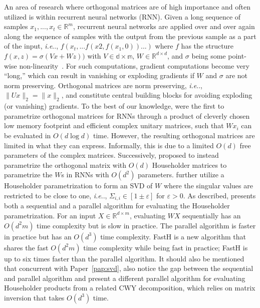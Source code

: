 \documentclass[11pt,a4paper,twoside,openright,final]{memoir}
\makeatletter
\DeclareRobustCommand\onedot{\futurelet\@let@token\@onedot}
\def\@onedot{\ifx\@let@token.\else.\null\fi\xspace}
\def\ie{\emph{i.e}\onedot} \def\Ie{\emph{I.e}\onedot}
\newcommand*{\paperref}[1]{Paper~\hyperref[#1]{\ref{#1}}}
\makeatother
\begin{document}
An area of research where orthogonal matrices are of high importance and often utilized is within recurrent neural networks (RNN).
Given a long sequence of samples $x_1, ..., x_t\in\mathbb{R}^{m}$, recurrent neural networks are applied over and over again along the sequence of samples with the output from the previous sample as a part of the input, \ie, $f(x_t, ...f(x2, f(x_1, 0)) ... )$ where $f$ has the structure $f(x, z) = \sigma( Vx + Wz) )$ with $V\in \mathbb{d\times m}$, $W\in\mathbb{R}^{d\times d}$, and $\sigma$ being some point-wise non-linearity~\cite{urnn}.
For such computations, gradient computations become very ``long,'' which can result in vanishing or exploding gradients if $W$ and $\sigma$ are not norm preserving.
Orthogonal matrices are norm preserving, \ie, $\|Ux\|_2 = \|x\|_2$, and constitute central building blocks for avoiding exploding (or vanishing) gradients.
To the best of our knowledge, \citet{urnn} were the first to parametrize orthogonal matrices for RNNs through a product of cleverly chosen low memory footprint and efficient complex unitary matrices, such that $Wx_i$ can be evaluated in $O(d \log d)$ time.
However, the resulting orthogonal matrices are limited in what they can express. 
Informally, this is due to a limited $O(d)$ free parameters of the complex matrices.
Successively, \citet{hh-rnn} proposed to instead parametrize the orthogonal matrix with $O(d)$ Householder matrices to parametrize the $W$s in RNNs with $O(d^2)$ parameters. 
\citet{sequential} further utilize a Householder parametrization to form an SVD of $W$ where the singular values are restricted to be close to one, \ie, $\Sigma_{i,i} \in [1\pm\varepsilon]$ for $\varepsilon > 0$. 
As described, \cite{sequential} presents both a sequential and a parallel algorithm for evaluating the Householder parametrization.
For an input $X\in\mathbb{R}^{d\times m}$, evaluating $WX$ sequentially has an $O(d^2m)$ time complexity but is slow in practice. 
The parallel algorithm is faster in practice but has an $O(d^3)$ time complexity. 
FastH is a new algorithm that shares the fast $O(d^2m)$ time complexity while being fast in practice; 
FastH is up to six times faster than the parallel algorithm.
It should also be mentioned that concurrent with \paperref{pap:svd}, \citet{cwy-dec} also notice the gap between the sequential and parallel algorithm and present a different parallel algorithm for evaluating Householder products from a related CWY decomposition, which relies on matrix inversion that takes $O(d^3)$ time.
\end{document}

